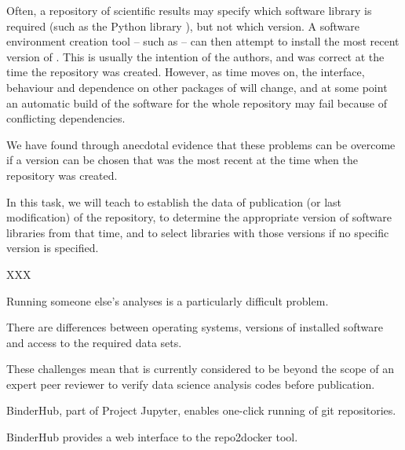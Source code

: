 \begin{task}[
  title=repo2docker development,
  id=repo2docker-timemachine,
  lead=SRL,
  PM=38,
  wphases={0-36!1.055},
  partners={QS,MP}
]

Often, a repository of scientific results may
specify which software library is required (such as the Python library
), but not which version. A software environment creation
tool -- such as \repotodocker -- can then attempt to install the most recent
version of . This is usually the intention of the authors,
and was correct at the time the repository was created.  However, as time moves
on, the interface, behaviour and dependence on other packages of
 will change, and at some point an automatic build of the
software for the whole repository may fail because of conflicting dependencies.

We have found through anecdotal evidence that these problems can be overcome if a
 version can be chosen that was the most recent at the time
when the repository was created.

In this task, we will teach \repotodocker to establish the data of publication
(or last modification) of the repository, to determine the appropriate version
of software libraries from that time, and to select libraries with those
versions if no specific version is specified.

XXX



  Running someone else's analyses is a particularly difficult problem.

  There are differences between operating systems, versions of installed
  software and access to the required data sets.
  
  These challenges mean that is currently considered to be beyond the scope of
  an expert peer reviewer to verify data science analysis codes before
  publication.
  
  BinderHub, part of Project Jupyter, enables one-click running of git repositories.

  BinderHub provides a web interface to the repo2docker tool.


  

\end{task}
